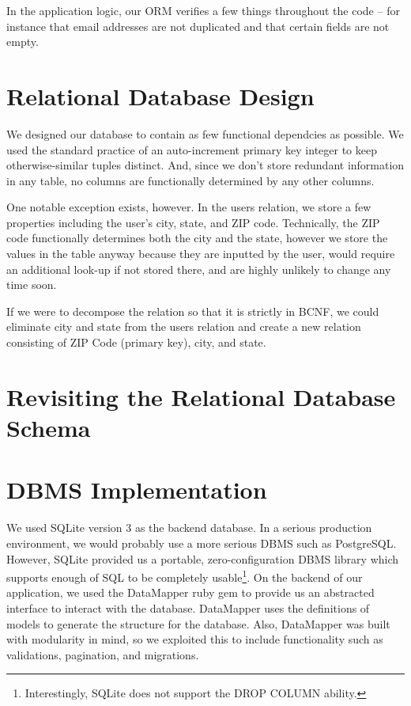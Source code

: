 \documentclass{acm_proc_article-sp}
\begin{document}
In the application logic, our ORM verifies a few things throughout the code -- for instance that email addresses 
are not duplicated and that certain fields are not empty.

\section{Relational Database Design}
We designed our database to contain as few functional dependcies as possible. We used the standard practice of an
auto-increment primary key integer to keep otherwise-similar tuples distinct. And, since we don't store redundant information
in any table, no columns are functionally determined by any other columns.

One notable exception exists, however. In the users relation, we store a few properties including the user's city, state, and ZIP code. 
Technically, the ZIP code functionally determines both the city and the state, however we store the values in the table
anyway because they are inputted by the user, would require an additional look-up if not stored there, and are highly unlikely
to change any time soon. 

If we were to decompose the relation so that it is strictly in BCNF, we could eliminate city and state from the users
relation and create a new relation consisting of ZIP Code (primary key), city, and state.
\section{Revisiting the Relational Database Schema}
\section{DBMS Implementation}
We used SQLite version 3 as the backend database. In a serious production environment, we would probably use
a more serious DBMS such as PostgreSQL. However, SQLite provided us a portable, zero-configuration DBMS library
which supports enough of SQL to be completely usable\footnote{Interestingly, SQLite does not support the DROP COLUMN ability.}.
On the backend of our application, we used the DataMapper ruby gem to provide us an abstracted interface to
interact with the database. DataMapper uses the definitions of models to generate the structure for the database.
Also, DataMapper was built with modularity in mind, so we exploited this to include functionality such as validations,
pagination, and migrations.
\end{document}
